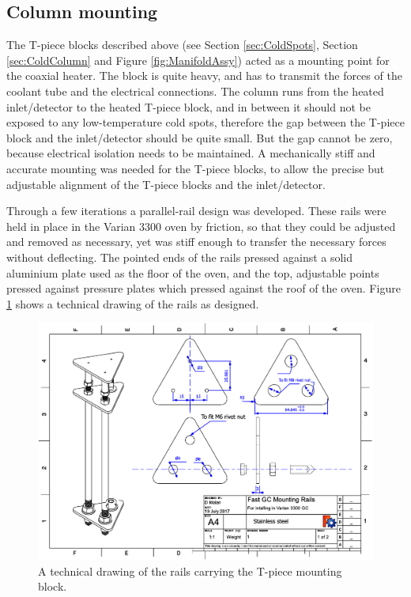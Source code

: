 \subsection{Column mounting}

The T-piece blocks described above (see Section \ref{sec:ColdSpots}, Section
\ref{sec:ColdColumn} and Figure \ref{fig:ManifoldAssy}) acted as a mounting
point for the coaxial heater. The block is quite heavy, and has to transmit the
forces of the coolant tube and the electrical connections. The column runs from
the heated inlet/detector to the heated T-piece block, and in between it should
not be exposed to any low-temperature cold spots, therefore the gap between the
T-piece block and the inlet/detector should be quite small. But the gap cannot
be zero, because electrical isolation needs to be maintained. A mechanically
stiff and accurate mounting was needed for the T-piece blocks, to allow the
precise but adjustable alignment of the T-piece blocks and the inlet/detector.

Through a few iterations a parallel-rail design was developed. These rails were
held in place in the Varian 3300 oven by friction, so that they could be
adjusted and removed as necessary, yet was stiff enough to transfer the
necessary forces without deflecting. The pointed ends of
the rails pressed against a solid aluminium plate used as the floor of the oven,
and the top, adjustable points pressed against pressure plates which pressed
against the roof of the oven. Figure \ref{fig:RailsDrawing} shows a
technical drawing of the rails as designed. 

\begin{figure}
	\centering
	\includegraphics[angle=90, origin=c, scale=0.75]{Figures/RailsDrawing.pdf}
	\decoRule	
	
	\caption[Technical drawing of coaxial heater mounting
	rails]{\label{fig:RailsDrawing}A technical drawing of the rails carrying the
	T-piece mounting block.}
	
\end{figure}

